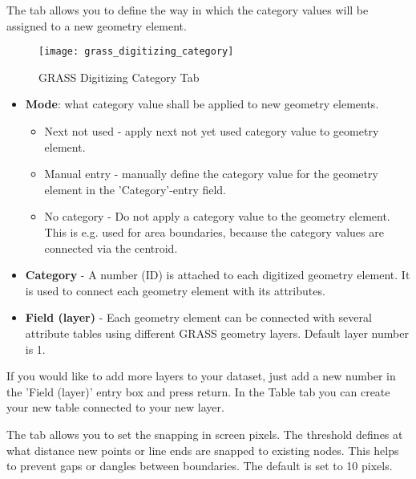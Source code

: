 
The  tab allows you to define the way in which the category 
values will be assigned to a new geometry element.

\begin{figure}[h]
 \centering
  \texttt{[image: grass\_digitizing\_category]} 
  \caption{GRASS Digitizing Category Tab \nixcaption}\label{fig:grass_digitizing_category}
 \end{figure}

\begin{itemize}[label=--]
\item \textbf{Mode}: what category value shall be applied to new geometry 
elements.
\begin{itemize}[label=--]
\item Next not used - apply next not yet used category value to geometry
element.
\item Manual entry - manually define the category value for the geometry
element in the 'Category'-entry field.
\item No category - Do not apply a category value to the geometry element.
This is e.g. used for area boundaries, because the category values are
connected via the centroid.
\end{itemize}
\item \textbf{Category} - A number (ID) is attached to each digitized geometry
element. It is used to connect each geometry element with its attributes.
\item \textbf{Field (layer)} - Each geometry element can be connected with
several attribute tables using different GRASS geometry layers. Default layer
number is 1. 
\end{itemize}

\begin{Tip}\caption{\textsc{Creating an additional GRASS 'layer' with QGIS}}
If you would like to add more layers to your dataset, just add a new
number in the 'Field (layer)' entry box and press return. In the Table tab
you can create your new table connected to your new layer.
\end{Tip}

\label{label_settingtab}

The  tab allows you to set the snapping in screen pixels. The
threshold defines at what distance new points or line ends are snapped to
existing nodes. This helps to prevent gaps or dangles between boundaries. The
default is set to 10 pixels.

